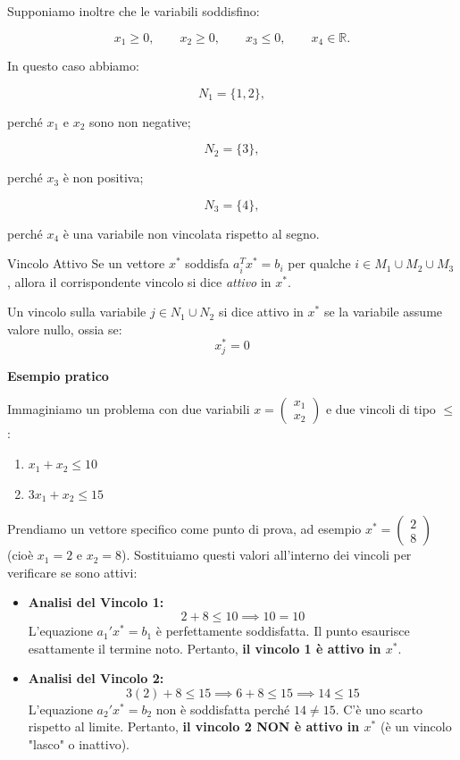 Supponiamo inoltre che le variabili soddisfino:

\[
x_1\ge0,\qquad
x_2\ge0,\qquad
x_3\le0,\qquad
x_4\in\mathbb{R}.
\]

In questo caso abbiamo:

\[
N_1=\{1,2\},
\]

perché $x_1$ e $x_2$ sono non negative;

\[
N_2=\{3\},
\]

perché $x_3$ è non positiva;

\[
N_3=\{4\},
\]

perché $x_4$ è una variabile non vincolata rispetto al segno.



\begin{definition}{Vincolo Attivo}
Se un vettore $x^*$ soddisfa $a_i^Tx^* = b_i$ per qualche $i \in M_1 \cup M_2 \cup M_3$, allora il corrispondente vincolo si dice \textit{attivo} in $x^*$.

Un vincolo sulla variabile $j \in N_1 \cup N_2$ si dice attivo in $x^*$ se la variabile assume valore nullo, ossia se:   $$x_j^* = 0$$


\end{definition}


\textbf{Esempio pratico}

Immaginiamo un problema con due variabili $x = \begin{pmatrix} x_1 \\ x_2 \end{pmatrix}$ e due vincoli di tipo $\le$:
\begin{enumerate}
    \item $x_1 + x_2 \le 10$
    \item $3x_1 + x_2 \le 15$
\end{enumerate}

Prendiamo un vettore specifico come punto di prova, ad esempio $x^* = \begin{pmatrix} 2 \\ 8 \end{pmatrix}$ (cioè $x_1 = 2$ e $x_2 = 8$). Sostituiamo questi valori all'interno dei vincoli per verificare se sono attivi:

\begin{itemize}
    \item \textbf{Analisi del Vincolo 1:}\\
    $$ 2 + 8 \le 10 \implies 10 = 10 $$
    L'equazione $a_1'x^* = b_1$ è perfettamente soddisfatta. Il punto esaurisce esattamente il termine noto. Pertanto, \textbf{il vincolo 1 è attivo in $x^*$}.

    \item \textbf{Analisi del Vincolo 2:}\\
    $$ 3(2) + 8 \le 15 \implies 6 + 8 \le 15 \implies 14 \le 15 $$
    L'equazione $a_2'x^* = b_2$ non è soddisfatta perché $14 \neq 15$. C'è uno scarto rispetto al limite. Pertanto, \textbf{il vincolo 2 NON è attivo in $x^*$} (è un vincolo "lasco" o inattivo).
\end{itemize}

